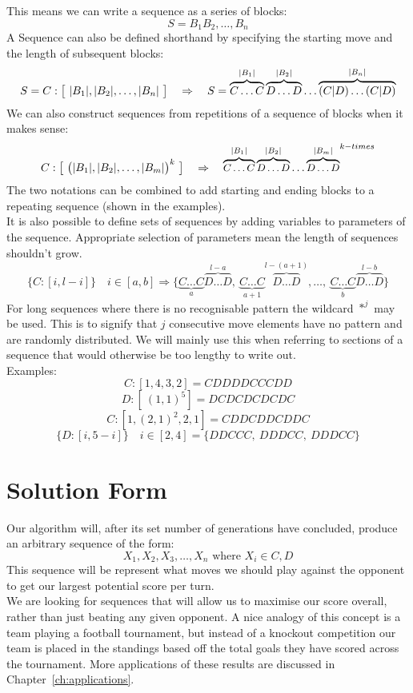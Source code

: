 This means we can write a sequence as a series of blocks:
\[S= B_1 B_2,\ldots,B_n\]
A Sequence can also be defined shorthand by specifying the starting move and the length of subsequent blocks:
\[S = C:\big{[}\ |B_1|,|B_2|,\ldots,|B_n|\ \big{]} \quad \Rightarrow \quad S=\overbrace{C\ldots C}^{|B_1|}\overbrace{D\ldots D}^{|B_2|}\ldots\overbrace{(C|D)\ldots (C|D)}^{|B_n|} \]
We can also construct sequences from repetitions of a sequence of blocks when it makes sense:
\[C:\big{[}\ \big{(}|B_1|,|B_2|,\ldots,|B_m|\big{)}^{k}\ \big{]} \quad \Rightarrow \quad {\small{\overbrace{C\ldots C}^{|B_1|}\overbrace{D\ldots D}^{|B_2|}\ldots\overbrace{D\ldots D}^{|B_m|}}}^{k-times}\]
The two notations can be combined to add starting and ending blocks to a repeating sequence (shown in the examples).\\

It is also possible to define sets of sequences by adding variables to parameters of the sequence.
Appropriate selection of parameters mean the length of sequences shouldn't grow.
\[ \{C:[i,l-i]\} \quad i\in [a,b] \Rightarrow \{\underbrace{C\ldots C}_{a}\overbrace{D\ldots D}^{l-a},\ \underbrace{C\ldots C}_{a+1}\overbrace{D\ldots D}^{l-(a+1)},\ldots ,\ \underbrace{C\ldots C}_{b}\overbrace{D\ldots D}^{l-b}\} \]
For long sequences where there is no recognisable pattern the wildcard \(*^{j}\) may be used.
This is to signify that \(j\) consecutive move elements have no pattern and are randomly distributed.
We will mainly use this when referring to sections of a sequence that would otherwise be too lengthy to write out.\\

Examples:
\[ C:[1,4,3,2] = CDDDDCCCDD \]
\[ D:[\ (1,1)^{5}] = DCDCDCDCDC \]
\[ C:[1,(2,1)^{2},2,1] = CDDCDDCDDC \]
\[ \{D:[i,5-i]\} \quad i\in [2,4] = \{DDCCC,\ DDDCC,\ DDDCC\}\]

\section{Solution Form}\label{sec:solutionForm}
Our algorithm will, after its set number of generations have concluded, produce an arbitrary sequence of the form:
\[X_1,X_2,X_3,\ldots ,X_n \textrm{ where }  X_i \in {C,D}\]
This sequence will be represent what moves we should play against the opponent to get our largest potential score per turn.\\

We are looking for sequences that will allow us to maximise our score overall, rather than just beating any given opponent.
A nice analogy of this concept is a team playing a football tournament, but instead of a knockout competition our team is placed in the standings based off the total goals they have scored across the tournament.
More applications of these results are discussed in Chapter~\ref{ch:applications}.\\

